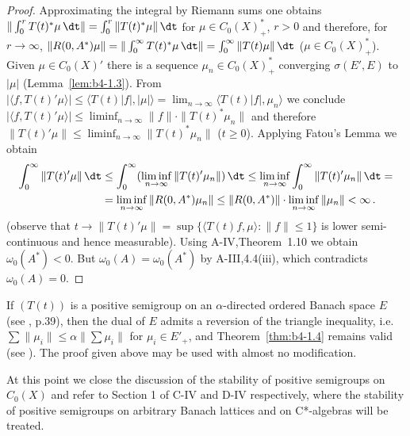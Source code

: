\begin{proof}
Approximating the integral by Riemann sums one obtains $\|\int_0^r T(t)^*\mu \, \dt\| = \int_0^r \|T(t)^*\mu\| \, \dt$ for $\mu \in C_{0}(X)^*_+$, $r  >  0$ and therefore, for $r \to \infty$, $\|R(0,A^*)\mu\| = \|\int_0^{\infty} T(t)^*\mu \, \dt\| 
 = \int_0^{\infty} \|T(t)\mu\| \, \dt$ 
 ($\mu \in C_{0}(X)_{+}^{*}$). 
Given $\mu \in C_{0}(X)'$ there is a sequence $\mu_n \in C_{0}(X)^*_+$ converging $\sigma(E',E)$ to $|\mu|$ (Lemma~\ref{lem:b4-1.3}).
From $|\langle f,T(t)'\mu \rangle| \leq \langle T(t)|f|,|\mu| \rangle = \lim_{n\to\infty} \langle T(t)|f|,\mu_n \rangle$ we conclude $|\langle f,T(t)'\mu \rangle| \leq \liminf_{n\to\infty}\|f\| \cdot \|T(t)^*\mu_n\|$ and therefore $\|T(t)'\mu\| \leq \liminf_{n\to\infty}\|T(t)^*\mu_n\|$ ($t \geq 0$). 
Applying Fatou's Lemma we obtain 
\[
\begin{aligned}
	\int_0^{\infty} \|T(t)'\mu\| \, \dt &\leq \int_0^{\infty} (\liminf_{n\to\infty} \|T(t)'\mu_n\|) \, \dt \leq  
	\liminf_{n\to\infty} \int_0^{\infty} \|T(t)'\mu_n\| \, \dt = \\ 
	& = \liminf_{n\to\infty} \|R(0,A^{*})\mu_n\| \leq \|R(0,A^{*})\|\cdot\liminf_{n\to\infty} \|\mu_n\| < \infty\,.
\end{aligned}
\]
(observe that $t \to \|T(t)'\mu\| = \sup \{\langle T(t)f,\mu \rangle \colon \|f\| \leq 1\}$ is lower semi-continuous and hence measurable). 
Using A-IV,Theorem~1.10 we obtain $\omega_{0}(A^{*})<0$. But $\omega_{0}(A) = \omega_{0}(A^{*})$ by A-III,4.4(iii), which contradicts $\omega_{0}(A) = 0$.
\end{proof}

\begin{remark}\label{rem:b4-1.5}
If $(T(t))$ is a positive semigroup on an $\alpha$-directed ordered Banach space $E$ (see \citet{asimowellis:1980}, p.39), 
then the dual of $E$ admits a reversion of the triangle inequality, 
i.e. $\sum\|\mu_i\| \leq \alpha\|\sum\mu_i\|$ 
for $\mu_i \in E'_+$, 
and Theorem~\ref{thm:b4-1.4} remains valid (see \citet{battydavies:1983}). 
The proof given above may be used with almost no modification.
\end{remark}

At this point we close the discussion of the stability of positive semigroups on $C_{0}(X)$ and refer to Section 1 of C-IV and D-IV respectively, where the stability of positive semigroups on arbitrary Banach lattices and on C*-algebras will be treated.
%
%
\newpage
%
